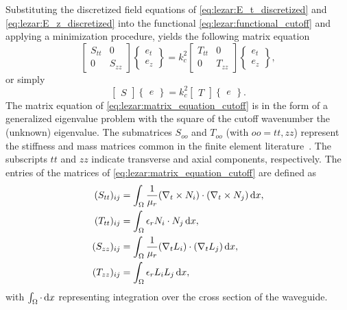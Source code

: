 Substituting the discretized field equations of
\eqref{eq:lezar:E_t_discretized} and \eqref{eq:lezar:E_z_discretized}
into the functional \eqref{eq:lezar:functional_cutoff} and
applying a minimization procedure, yields the following matrix
equation~\citep{Davidson2011}
\begin{equation}
    \label{eq:lezar:matrix_equation_cutoff}
    \begin{bmatrix}
      S_{tt} & 0\\0 & S_{zz}
    \end{bmatrix}
    \begin{Bmatrix}
    e_t
    \\
    e_z
    \end{Bmatrix}
  = k_c^2
    \begin{bmatrix}T_{tt} & 0
    \\
    0 &   T_{zz}\end{bmatrix}
    \begin{Bmatrix}
        e_t
      \\
      e_z
    \end{Bmatrix},
\end{equation}
or simply
\begin{equation}
  \begin{bmatrix}
      S
  \end{bmatrix}
  \begin{Bmatrix}
      e
    \end{Bmatrix}
  =
    k_c^2
    \begin{bmatrix}
      T
    \end{bmatrix}
    \begin{Bmatrix}
      e
    \end{Bmatrix}.
\end{equation}
The matrix equation of \eqref{eq:lezar:matrix_equation_cutoff}
is in the form of a generalized eigenvalue problem with the
square of the cutoff wavenumber the (unknown) eigenvalue. The
submatrices $S_{oo}$ and $T_{oo}$ (with $oo = tt, zz$)
represent the stiffness and mass matrices common in the finite element
literature~\citep{Davidson2011, Jin2002}. The subscripts $tt$ and $zz$
indicate transverse and axial components, respectively. The entries of
the matrices of \eqref{eq:lezar:matrix_equation_cutoff} are defined
as \citep{PelosiCoccioliSelleri1998, Jin2002}
\begin{align}
\label{eq:lezar:S_tt_ij}
(S_{tt})_{ij} &= \int_\Omega \frac{1}{\mu_r}(\nabla_t\times{N}_i)\cdot(\nabla_t\times{N}_j) \, \mathrm{d}x,\\
\label{eq:lezar:T_tt_ij}
(T_{tt})_{ij} &= \int_\Omega \epsilon_r{N}_i\cdot{N}_j \, \mathrm{d}x,\\
\label{eq:lezar:S_zz_ij}
(S_{zz})_{ij} &= \int_\Omega \frac{1}{\mu_r}(\nabla_t L_i)\cdot(\nabla_t L_j) \, \mathrm{d}x,\\
\label{eq:lezar:T_zz_ij}
(T_{zz})_{ij} &= \int_\Omega \epsilon_r L_i L_j \, \mathrm{d}x,
\end{align}
with $\int_\Omega\cdot \, \mathrm{d}x$ representing integration over the cross
section of the waveguide.

